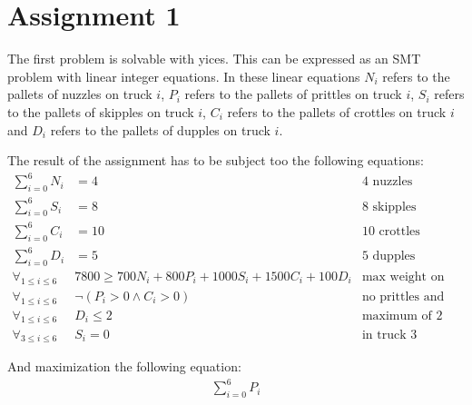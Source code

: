 \chapter{Assignment 1}
The first problem is solvable with yices. This can be expressed as an SMT problem with linear integer equations.  In these linear equations $N_i$ refers to the pallets of nuzzles on truck $i$, $P_i$ refers to the pallets of prittles on truck $i$, $S_i$ refers to the pallets of skipples on truck $i$, $C_i$ refers to the pallets of crottles on truck $i$ and $D_i$ refers to the pallets of dupples on truck $i$.

The result of the assignment has to be subject too the following equations:
\begin{align*} 
\sum_{i=0}^{6}N_i &= 4 &\text{4 nuzzles}\\ 
\sum_{i=0}^{6}S_i &= 8 &\text{8 skipples}\\ 
\sum_{i=0}^{6}C_i &= 10 &\text{10 crottles}\\ 
\sum_{i=0}^{6}D_i &= 5 &\text{5 dupples}\\
\forall_{1 \le i \le 6}\; &7800 \ge 700 N_i + 800 P_i + 1000 S_i + 1500 C_i + 100 D_i &\text{max weight on trucks}\\
\forall_{1 \le i \le 6}\; &\neg (P_i > 0 \land C_i > 0) &\text{no prittles and crottles together}\\
\forall_{1 \le i \le 6}\; &D_i \le 2 &\text{maximum of 2 dupples}\\
\forall_{3 \le i \le 6}\; &S_i = 0 &\text{in truck 3 through 6 no skipples}
\end{align*}

And maximization the following equation:
\begin{align*}
\sum_{i=0}^{6}P_i \\ 
\end{align*}

